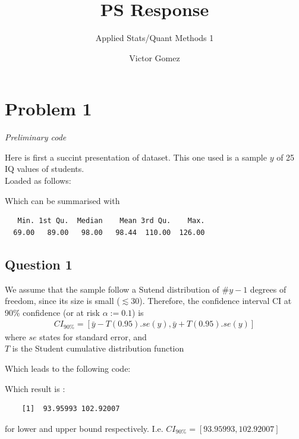 \documentclass[12pt,letterpaper]{article}
\title{ PS Response}
\date{Victor Gomez}
\author{Applied Stats/Quant Methods 1}
\begin{document}
	\maketitle
	

\section*{Problem 1 }

\textit{Preliminary code}\\

\vspace{.25cm}

\noindent  Here is first a succint presentation of dataset.  This one used is a sample $y$ of 25 IQ values of students.\\
Loaded as follows:

  

\noindent  Which can be summarised with

  
\begin{verbatim}
   Min. 1st Qu.  Median    Mean 3rd Qu.    Max. 
  69.00   89.00   98.00   98.44  110.00  126.00
\end{verbatim}

\vspace{.5cm}

\subsection*{Question 1}

We assume that the sample follow a Sutend distribution of $\# y -1$ degrees of freedom, since its size is small ($\lesssim 30 $).
Therefore, the confidence interval CI at 90\% confidence (or at risk $\alpha :=0.1$) is 
\begin{align*}
	CI_{90\%} = [\bar{y} - T(0.95).se(y) , \bar{y} +  T(0.95).se(y) ]
\end{align*}
where $se$ states for standard error, and \\
$T$ is the Student  cumulative distribution function

Which leads to the following code:

  

Which result is :

\begin{verbatim}
	[1]  93.95993 102.92007
\end{verbatim}
for lower and upper bound respectively. I.e. $CI_{90\%} = [93.95993, 102.92007]$
\end{document}
